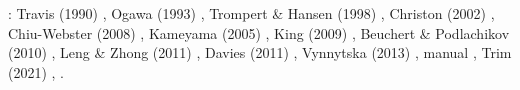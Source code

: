 \Literature: Travis \etal (1990) \cite{trab90},
Ogawa (1993) \cite{ogaw93},
Trompert \& Hansen (1998) \cite{trha98},
Christon \etal (2002) \cite{chgs02},
Chiu-Webster \etal (2008) \cite{chhl08},
Kameyama \etal (2005) \cite{kaks05},
King (2009) \cite{king09},
Beuchert \& Podlachikov (2010) \cite{bepo10},
Leng \& Zhong (2011) \cite{lezh11},
Davies \etal (2011) \cite{dawk11},
Vynnytska \etal (2013) \cite{vyrc13},
\aspect{} manual \cite{aspectmanual},
Trim \etal (2021) \cite{trbs21},
.



